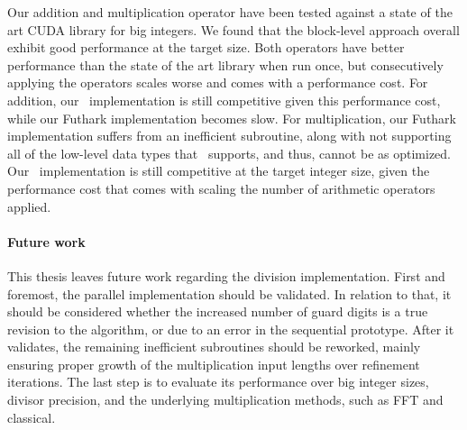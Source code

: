 Our addition and multiplication operator have been tested against a state of the
art CUDA library for big integers. We found that the block-level approach
overall exhibit good performance at the target size. Both operators have better
performance than the state of the art library when run once, but consecutively
applying the operators scales worse and comes with a performance cost. For
addition, our \cpp\ implementation is still competitive given this performance
cost, while our Futhark implementation becomes slow. For multiplication, our
Futhark implementation suffers from an inefficient subroutine, along with not
supporting all of the low-level data types that \cpp\ supports, and thus, cannot
be as optimized. Our \cpp\ implementation is still competitive at the target
integer size, given the performance cost that comes with scaling the number of
arithmetic operators applied.

\paragraph{Future work}
This thesis leaves future work regarding the division implementation. First and
foremost, the parallel implementation should be validated. In relation to that,
it should be considered whether the increased number of guard digits is a true
revision to the algorithm, or due to an error in the sequential prototype. After
it validates, the remaining inefficient subroutines should be reworked, mainly
ensuring proper growth of the multiplication input lengths over refinement
iterations. The last step is to evaluate its performance over big integer sizes,
divisor precision, and the underlying multiplication methods, such as FFT and
classical.

